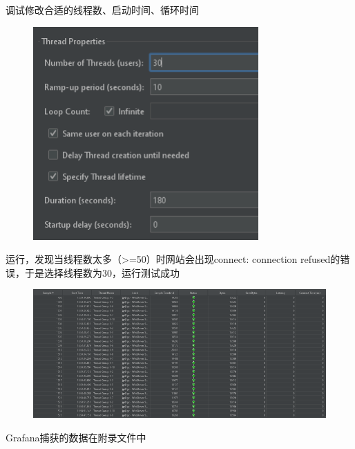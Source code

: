 \documentclass[hyperref,a4paper,UTF8]{ctexart}
\begin{document}
调试修改合适的线程数、启动时间、循环时间
\begin{figure}[H]
    \centering
    \includegraphics[width=0.75\linewidth]{测试/4.png}
    \label{fig:enter-label}
\end{figure}

运行，发现当线程数太多（>=50）时网站会出现connect: connection refused的错误，于是选择线程数为30，运行测试成功
\begin{figure}[H]
    \centering
    \includegraphics[width=0.75\linewidth]{测试/5.png}
    \label{fig:enter-label}
\end{figure}

Grafana捕获的数据在附录文件中
\end{document}

